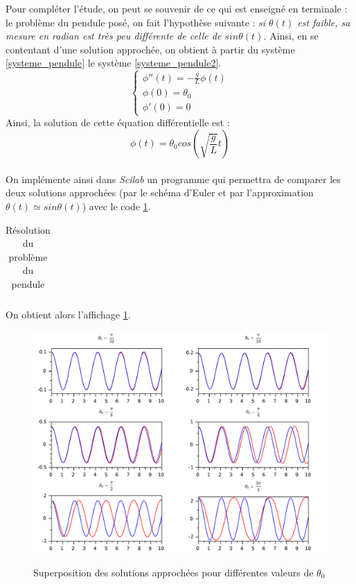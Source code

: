 \documentclass[a4paper,10pt]{report}
\begin{document}
Pour compléter l'étude, on peut se souvenir de ce qui est enseigné en terminale : le problème du pendule posé, on fait l'hypothèse suivante : \textit{si $\theta(t)$ est faible, sa mesure en radian est très peu différente de celle de $sin\theta(t)$.} Ainsi, en se contentant d'une solution approchée, on obtient à partir du système \ref{systeme_pendule} le système \ref{systeme_pendule2}.
\begin{equation}
\label{systeme_pendule2}
\left\lbrace
\begin{array}{l}
\phi''(t)= -\frac{g}{L}\phi (t)  \\
\phi(0)=\theta_0 \\
\phi'(0)=0
\end{array}\right.
\end{equation}
\indent Ainsi, la solution de cette équation différentielle est :
\begin{equation}
\phi(t)=\theta_0 cos \left( \sqrt{\frac{g}{L}}t \right)
\end{equation}\\

On implémente ainsi dans \textit{Scilab} un programme qui permettra de comparer les deux solutions approchées (par le schéma d'Euler et par l'approximation $\theta(t)\simeq sin\theta(t)$) avec le code \ref{code_pendule}.
\begin{table}[H]
\caption{Résolution du problème du pendule}
\begin{tabular}{l}

\label{code_pendule}
\end{tabular}
\end{table}

On obtient alors l'affichage \ref{aff_pendule}.
\begin{figure}[H]
\centering
\caption{Superposition des solutions approchées pour différentes valeurs de $\theta_0$}
\includegraphics[width=\textwidth]{graph_pendule.pdf}
\label{aff_pendule}
\end{figure}
\end{document}
